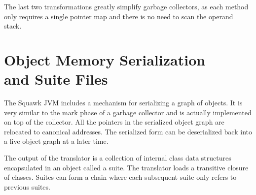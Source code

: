 \documentclass{sig-alt-sun}
\begin{document}
The last two transformations greatly simplify garbage collectors, as each 
method only requires a single pointer map and there is no need to scan the 
operand stack.  


\section{Object Memory Serialization \\ and Suite Files}

The Squawk JVM includes a mechanism for serializing a graph of objects.
It is very similar to the mark phase of a garbage collector
and is actually implemented on top of the collector. All the pointers
in the serialized object graph are relocated to canonical addresses.
The serialized form can be
deserialized back into a live object graph at a later time.

The output of the translator is a collection of internal class
data structures encapsulated in an object called a suite. The
translator loads a transitive closure of classes. 
Suites can form a chain where
each subsequent suite only refers to previous suites.
\end{document}
